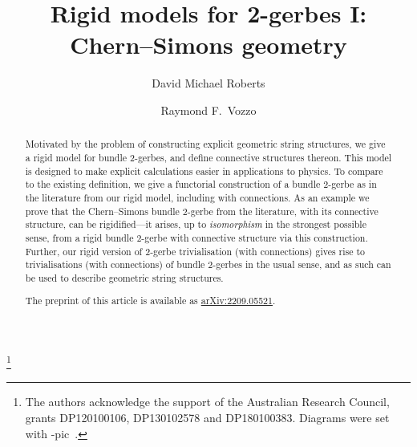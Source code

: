 \documentclass[12pt]{amsart}
\theoremstyle{plain}
\theoremstyle{definition}
\theoremstyle{remark}
\numberwithin{equation}{section}
\newcommand{\<}{\langle}
\renewcommand{\>}{\rangle}
\begin{document}


\title[Rigid 2-gerbes I]{Rigid models for 2-gerbes I: Chern--Simons geometry}
   
  \author[D.\ M.\ Roberts]{David Michael Roberts}
  \address[David Michael Roberts]
{Sirus-beta Labs\quad ||\quad 
 School of Computer and Mathematical Sciences\\
The University of Adelaide\\
  Adelaide, SA 5005 \\
  Australia
  }
  
  \author[R.\ F.\ Vozzo]{Raymond F.\ Vozzo}
\address[Raymond Vozzo]
{School of Computer and Mathematical Sciences\\
The University of Adelaide\\
  Adelaide, SA 5005 \\
  Australia}


\thanks{The authors acknowledge the support of the Australian
Research Council, grants DP120100106, DP130102578 and DP180100383. 
Diagrams were set with \Xy-pic\ \xyversion.}





\begin{abstract}
Motivated by the problem of constructing explicit geometric string structures, we give a rigid model for bundle 2-gerbes, and define connective structures thereon. 
This model is designed to make explicit calculations easier in applications to physics. 
To compare to the existing definition, we give a functorial construction of a bundle 2-gerbe as in the literature from our rigid model, including with connections.
As an example we prove that the Chern--Simons bundle 2-gerbe from the literature, with its connective structure, can be rigidified---it arises, up to \emph{isomorphism} in the strongest possible sense, from a rigid bundle 2-gerbe with connective structure via this construction.
Further, our rigid version of 2-gerbe trivialisation (with connections) gives rise to trivialisations (with connections) of bundle 2-gerbes in the usual sense, and as such can be used to describe geometric string structures.

The preprint of this article is available as \href{https://arxiv.org/abs/2209.05521}{arXiv:2209.05521}.
\end{abstract}
\end{document}
